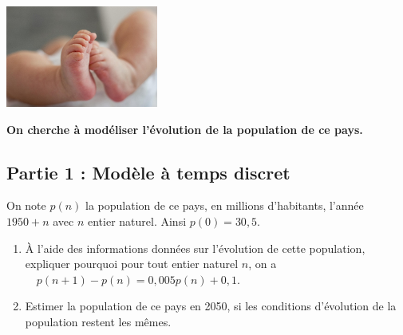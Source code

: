 \documentclass[a4paper,11pt,exos]{nsi}
\begin{document}
\maketitle

{\includegraphics[width=5cm]{baby-feet-2612403_640.jpg}}


\textbf{On cherche à modéliser l'évolution de la population de ce pays.}

\subsection*{Partie 1 : Modèle à temps discret}
On note $p(n)$ la population de ce pays, en millions d'habitants, l'année $1950+n$ avec $n$ entier naturel. Ainsi $p(0)=30,5$.
\begin{enumerate}
    \item À l'aide des informations données sur l'évolution de cette population, expliquer pourquoi pour tout entier naturel $n$, on a $\quad p(n+1)-p(n)=0,005p(n)+0,1$.
    \item Estimer la population de ce pays en 2050, si les conditions d'évolution de la population restent les mêmes.
\end{enumerate}
\end{document}
